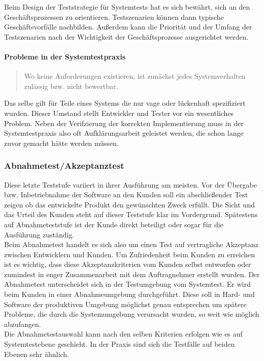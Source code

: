 Beim Design der Teststrategie für Systemtests hat es sich bewährt, sich an den Geschäftsprozessen zu orientieren. Testszenarien können dann typische Geschäftsvorfälle nachbilden. Außerdem kann die Priorität und  der Umfang der Testszenarien nach der Wichtigkeit der Geschäftsprozesse ausgerichtet werden.

\paragraph{Probleme in der Systemtestpraxis}

\begin{quote}
Wo keine Anforderungen existieren, ist zunächst jedes Systemverhalten zulässig bzw. nicht bewertbar\cite{spillner_basiswissen_2012}.
\end{quote}
Das selbe gilt für Teile eines Systems die nur vage oder lückenhaft spezifiziert wurden. Dieser Umstand stellt Entwickler und Tester vor ein wesentliches Problem. Neben der Verifzierung der korrekten Implementierung muss in der Systemtestpraxis also oft Aufklärungsarbeit geleistet werden, die schon lange zuvor gemacht hätte werden müssen.

\subsubsection{Abnahmetest/Akzeptanztest}
Diese letzte Teststufe variiert in ihrer Ausführung am meisten. Vor der Übergabe bzw. Inbetriebnahme der Software an den Kunden soll ein abschließender Test zeigen ob das entwickelte Produkt den gewünschten Zweck erfüllt. Die Sicht und das Urteil des Kunden steht auf dieser Teststufe klar im Vordergrund. Spätestens auf Abnahmeteststufe ist der Kunde direkt beteiligt oder sogar für die Ausführung zuständig.\\
Beim Abnahmetest handelt es sich also um einen Test auf vertragliche Akzeptanz zwischen Entwicklern und Kunden. Um Zufriedenheit beim Kunden zu erreichen ist es wichtig, dass diese Akzeptanzkriterien vom Kunden selbst entworfen oder zumindest in enger Zusammenarbeit mit dem Auftragnehmer erstellt wurden\cite{spillner_basiswissen_2012}. Der Abnahmetest unterscheidet sich in der Testumgebung vom Systemtest. Er wird beim Kunden in einer Abnahmeumgebung durchgeführt. Diese soll in Hard- und Software der produktiven Umgebung möglichst genau entsprechen um spätere Probleme, die durch die Systemumgebung verursacht wurden, so weit wie möglich abzufangen.\\
Die Abnahmetestauswahl kann nach den selben Kriterien erfolgen wie es auf Systemtestebene geschieht. In der Praxis sind sich die Testfälle auf beiden Ebenen sehr ähnlich.

